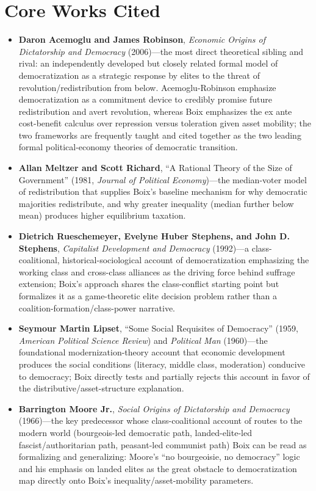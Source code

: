 \documentclass[12pt]{article}
\begin{document}
\section{Core Works Cited}

\begin{itemize}[leftmargin=*, itemsep=4pt]
    \item \textbf{Daron Acemoglu and James Robinson}, \textit{Economic Origins of Dictatorship and Democracy} (2006)---the most direct theoretical sibling and rival: an independently developed but closely related formal model of democratization as a strategic response by elites to the threat of revolution/redistribution from below. Acemoglu-Robinson emphasize democratization as a commitment device to credibly promise future redistribution and avert revolution, whereas Boix emphasizes the ex ante cost-benefit calculus over repression versus toleration given asset mobility; the two frameworks are frequently taught and cited together as the two leading formal political-economy theories of democratic transition.
    \item \textbf{Allan Meltzer and Scott Richard}, ``A Rational Theory of the Size of Government'' (1981, \textit{Journal of Political Economy})---the median-voter model of redistribution that supplies Boix's baseline mechanism for why democratic majorities redistribute, and why greater inequality (median further below mean) produces higher equilibrium taxation.
    \item \textbf{Dietrich Rueschemeyer, Evelyne Huber Stephens, and John D. Stephens}, \textit{Capitalist Development and Democracy} (1992)---a class-coalitional, historical-sociological account of democratization emphasizing the working class and cross-class alliances as the driving force behind suffrage extension; Boix's approach shares the class-conflict starting point but formalizes it as a game-theoretic elite decision problem rather than a coalition-formation/class-power narrative.
    \item \textbf{Seymour Martin Lipset}, ``Some Social Requisites of Democracy'' (1959, \textit{American Political Science Review}) and \textit{Political Man} (1960)---the foundational modernization-theory account that economic development produces the social conditions (literacy, middle class, moderation) conducive to democracy; Boix directly tests and partially rejects this account in favor of the distributive/asset-structure explanation.
    \item \textbf{Barrington Moore Jr.}, \textit{Social Origins of Dictatorship and Democracy} (1966)---the key predecessor whose class-coalitional account of routes to the modern world (bourgeois-led democratic path, landed-elite-led fascist/authoritarian path, peasant-led communist path) Boix can be read as formalizing and generalizing: Moore's ``no bourgeoisie, no democracy'' logic and his emphasis on landed elites as the great obstacle to democratization map directly onto Boix's inequality/asset-mobility parameters.

\end{itemize}
\end{document}
